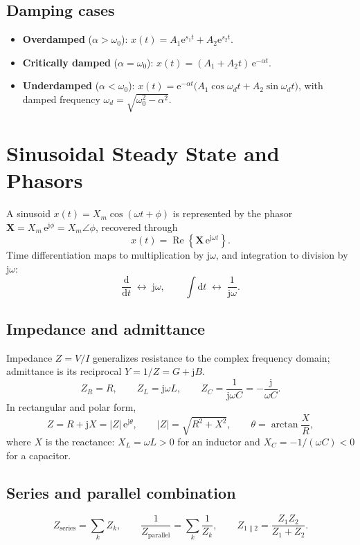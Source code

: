 \documentclass[11pt,a4paper]{article}
\newcommand{\dd}{\mathrm{d}}
\newcommand{\ee}{\mathrm{e}}
\newcommand{\jj}{\mathrm{j}}
\renewcommand{\Re}{\operatorname{Re}}
\begin{document}
\subsection{Damping cases}
\begin{itemize}
  \item \textbf{Overdamped} ($\alpha > \omega_0$):
        $x(t) = A_1\ee^{s_1 t} + A_2\ee^{s_2 t}$.
  \item \textbf{Critically damped} ($\alpha = \omega_0$):
        $x(t) = (A_1 + A_2 t)\,\ee^{-\alpha t}$.
  \item \textbf{Underdamped} ($\alpha < \omega_0$):
        $x(t) = \ee^{-\alpha t}\bigl(A_1\cos\omega_d t + A_2\sin\omega_d t\bigr)$,
        with damped frequency $\omega_d = \sqrt{\omega_0^2 - \alpha^2}$.
\end{itemize}

\section{Sinusoidal Steady State and Phasors}

A sinusoid $x(t) = X_m\cos(\omega t + \phi)$ is represented by the phasor
$\mathbf{X} = X_m\,\ee^{\jj\phi} = X_m\angle\phi$, recovered through
\[
  x(t) = \Re\!\left\{\mathbf{X}\,\ee^{\jj\omega t}\right\}.
\]
Time differentiation maps to multiplication by $\jj\omega$, and integration to
division by $\jj\omega$:
\[
  \frac{\dd}{\dd t} \;\longleftrightarrow\; \jj\omega, \qquad
  \int \dd t \;\longleftrightarrow\; \frac{1}{\jj\omega}.
\]

\subsection{Impedance and admittance}
Impedance $Z = V/I$ generalizes resistance to the complex frequency domain;
admittance is its reciprocal $Y = 1/Z = G + \jj B$.
\[
  Z_R = R, \qquad
  Z_L = \jj\omega L, \qquad
  Z_C = \frac{1}{\jj\omega C} = -\frac{\jj}{\omega C}.
\]
In rectangular and polar form,
\[
  Z = R + \jj X = |Z|\,\ee^{\jj\theta}, \qquad
  |Z| = \sqrt{R^2 + X^2}, \qquad
  \theta = \arctan\!\frac{X}{R},
\]
where $X$ is the reactance: $X_L = \omega L > 0$ for an inductor and
$X_C = -1/(\omega C) < 0$ for a capacitor.

\subsection{Series and parallel combination}
\[
  Z_{\text{series}} = \sum_k Z_k, \qquad
  \frac{1}{Z_{\text{parallel}}} = \sum_k \frac{1}{Z_k}, \qquad
  Z_{1\parallel 2} = \frac{Z_1 Z_2}{Z_1 + Z_2}.
\]
\end{document}
